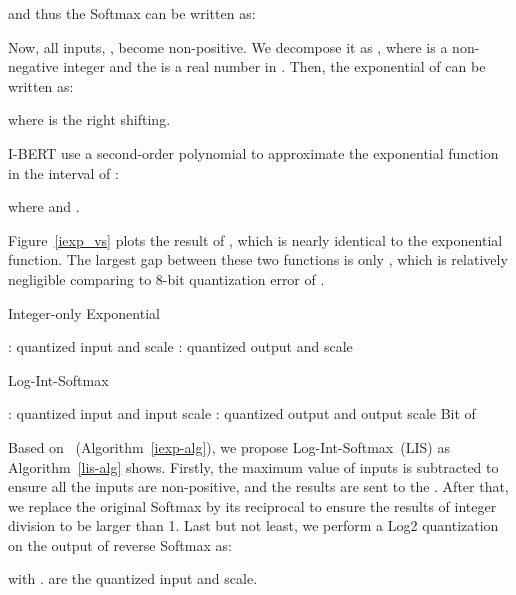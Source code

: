 \documentclass{article}
\begin{document}
and thus the Softmax can be written as:


Now, all inputs, , become non-positive. We decompose it as , where  is a non-negative integer and the  is a real number in . Then, the exponential of  can be written as:

where  is the right shifting.

I-BERT use a second-order polynomial to approximate the exponential function in the interval of :


where  and . 


Figure~\ref{iexp_vs} plots the result of , which is nearly identical to the exponential function. The largest gap between these two functions is only , which is relatively negligible comparing to 8-bit quantization error of .


\begin{algorithm}[t]
\caption{Integer-only Exponential}
\label{iexp-alg}
\begin{algorithmic}[1]
 : quantized input and scale
 : quantized output and scale
\vskip 0.075in
{
\STATE 
\STATE 
\STATE 
\STATE 
\STATE 
\STATE 
\STATE 
\STATE 
\STATE \Return 
}
\ENDFUNCTION
\end{algorithmic}
\end{algorithm}

\begin{algorithm}[t]
\caption{Log-Int-Softmax}  
\label{lis-alg}
\begin{algorithmic}[0]  : quantized input and input scale
 : quantized output and output scale
\vskip 0.075in
{
\STATE  
\STATE  Bit of 
\STATE 
\STATE \Return 
}
\ENDFUNCTION
{}
\ENDFUNCTION
\end{algorithmic}  
\end{algorithm}  

Based on ~(Algorithm~\ref{iexp-alg}), we propose Log-Int-Softmax~(LIS) as Algorithm~\ref{lis-alg} shows. Firstly, the maximum value of inputs is subtracted to ensure all the inputs are non-positive, and the results are sent to the . After that, we replace the original Softmax by its reciprocal to ensure the results of integer division to be larger than 1. Last but not least, we perform a Log2 quantization on the output of reverse Softmax as:

with .  are the quantized input and scale. 
\end{document}
